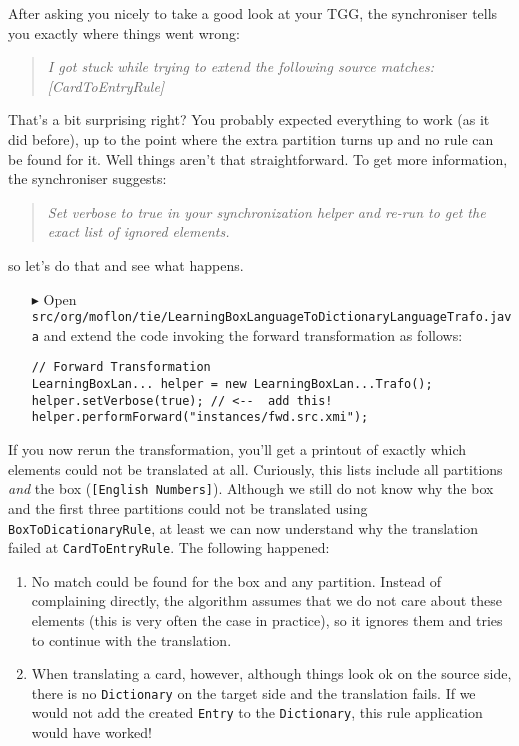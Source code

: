 After asking you nicely to take a good look at your TGG, the synchroniser tells you exactly where things went wrong:
\begin{quote}
  \emph{I got stuck while trying to extend the following source matches: [CardToEntryRule]}
\end{quote}
That's a bit surprising right?  You probably expected everything to work (as it did before), up to the point where the extra partition turns up and no rule can be found for it.
Well things aren't that straightforward.
To get more information, the synchroniser suggests:
\begin{quote}
  \emph{Set verbose to true in your synchronization helper and re-run to get the exact list of ignored elements.}
\end{quote}
so let's do that and see what happens.

\begin{itemize}
\item[$\blacktriangleright$] Open \texttt{src/org/moflon/tie/Learning\-Box\-Language\-To\-Dictionary\-Lan\-guage\-Trafo.java} and extend the code invoking the forward transformation as follows:
\begin{verbatim}
// Forward Transformation
LearningBoxLan... helper = new LearningBoxLan...Trafo();
helper.setVerbose(true); // <--  add this!
helper.performForward("instances/fwd.src.xmi");
\end{verbatim}
\end{itemize}

If you now rerun the transformation, you'll get a printout of exactly which elements could not be translated at all.
Curiously, this lists include all partitions \emph{and} the box (\texttt{[English Numbers]}).
Although we still do not know why the box and the first three partitions could not be translated using \texttt{BoxToDicationaryRule}, at least we can now understand why the translation failed at \texttt{CardToEntryRule}.
The following happened:
\begin{enumerate}
\item No match could be found for the box and any partition.  
Instead of complaining directly, the algorithm assumes that we do not care about these elements (this is very often the case in practice), so it ignores them and tries to continue with the translation.
\item When translating a card, however, although things look ok on the source side, there is no \texttt{Dictionary} on the target side and the translation fails.
If we would not add the created \texttt{Entry} to the \texttt{Dictionary}, this rule application would have worked! 
\end{enumerate}

